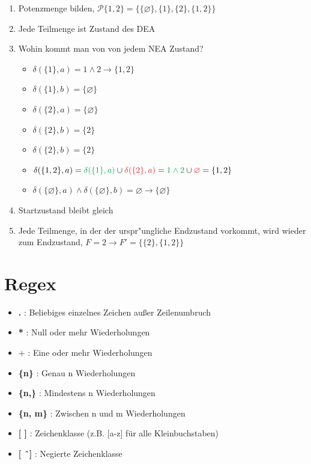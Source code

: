 \documentclass[11pt, a4paper]{scrartcl}
\newcommand{\gr}[1]{{\color{Green}#1}}
\newcommand{\rd}[1]{{\color{Red}#1}}
\begin{document}
\vspace{0.5em}

\begin{enumerate}
    \item Potenzmenge bilden, $\mathcal{P}\{1, 2\} = \{\{\varnothing \}, \{1\}, \{2\}, \{1, 2\}\}$
    \item Jede Teilmenge ist Zustand des DEA
    \item Wohin kommt man von von jedem NEA Zustand?
    \begin{itemize}
        \item $\delta(\{1\}, a) = 1 \land 2 \rightarrow \{1, 2\}$ 
        \item $\delta(\{1\}, b) = \{\varnothing\}$
        \item $\delta(\{2\}, a) = \{\varnothing\}$
        \item $\delta(\{2\}, b) = \{2\}$
        \item $\delta(\{2\}, b) = \{2\}$
        \item $\delta(\{1, 2\}, a) = \gr{\delta(\{1\}, a)} \cup \rd{\delta(\{2\}, a)} = \gr{1 \land 2} \cup \rd{\varnothing} = \{1, 2\}$
        \item $\delta(\{\varnothing\}, a) \land \delta(\{\varnothing\}, b) = \varnothing \rightarrow \{\varnothing\}$
    \end{itemize}
    \item Startzustand bleibt gleich
    \item Jede Teilmenge, in der der urspr"ungliche Endzustand vorkommt, wird wieder zum Endzustand, $F = 2 \rightarrow F' = \{\{2\}, \{1, 2\}\}$
\end{enumerate}

\newpage


\section{Regex}


\begin{itemize}
    \item \textbf{.} : Beliebiges einzelnes Zeichen außer Zeilenumbruch
    \item \textbf{*} : Null oder mehr Wiederholungen
    \item \textbf{$+$} : Eine oder mehr Wiederholungen
    \item \textbf{\{n\}} : Genau n Wiederholungen
    \item \textbf{\{n,\}} : Mindestens n Wiederholungen
    \item \textbf{\{n, m\}} : Zwischen n und m Wiederholungen
    \item \textbf{[ ]} : Zeichenklasse (z.B. [a-z] für alle Kleinbuchstaben)
    \item \textbf{[ \^\ ]} : Negierte Zeichenklasse
\end{itemize}
\end{document}
